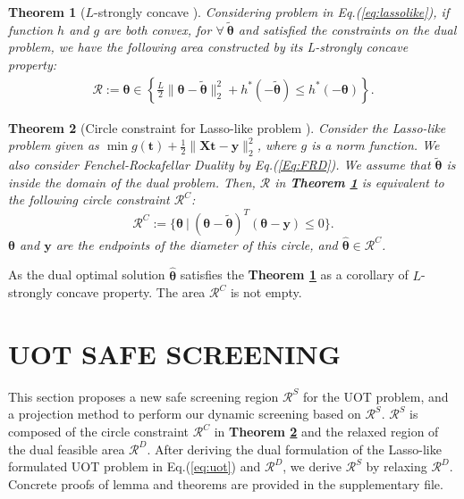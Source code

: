 \documentclass[twoside]{article}
\theoremstyle{plain}
\newtheorem{thm}{Theorem}
\newcommand{\mat}[1]{\mathbf{#1}}
\renewcommand{\vec}[1]{\bm{#1}}
\begin{document}
\begin{thm}[$L$-strongly concave {\citep[Theorem 5]{Yamada_NIPS_2021}}]
\label{Thm:circle}
Considering problem in Eq.(\ref{eq:lassolike}), if function $h$ and $g$ are both convex, for $\forall \ \tilde{\vec{\theta}}$ and satisfied the constraints on the dual problem, we have the following area constructed by its L-strongly concave property:
$$
\begin{aligned}
\mathcal{R}:=\vec{\theta} \in \left\{\frac{L}{2}\|\vec{\theta}-\tilde{\vec{\theta}}\|_2^2+h^*(-\tilde{\vec{\theta}}) \leq h^*(-\vec{\theta})\right\}.
\end{aligned}
$$
\end{thm}

\begin{thm}[Circle constraint for Lasso-like problem {\citep[Theorem 8]{Yamada_NIPS_2021}}]
\label{Thm:CC}
Consider the Lasso-like problem given as $\min g(\vec{t}) + \frac{1}{2}\|\mat{X} \vec{t}-\vec{y}\|_2^2$, where $g$ is a norm function. We also consider Fenchel-Rockafellar Duality by Eq.(\ref{Eq:FRD}). We assume that $\tilde{\vec{\theta}}$ is inside the domain of the dual problem. Then, $\mathcal{R}$ in {\bf Theorem \ref{Thm:circle}} is equivalent to the following circle constraint $\mathcal{R}^{C}$:
\begin{equation}
\mathcal{R}^{C} :=\{\vec\theta\ |\ (\vec{\theta}-\tilde{\vec{\theta}})^T(\vec{\theta}-\vec{y})\leq 0\}.
\label{eq:uotcircle}
\end{equation}
$\vec\theta$ and $\vec y$ are the endpoints of the diameter of this circle, and $\hat{ \vec\theta} \in \mathcal{R}^{C}$.
\end{thm}
As the dual optimal solution $\hat{\vec{\theta}}$ satisfies the {\bf Theorem \ref{Thm:circle}} as a corollary of $L$-strongly concave property. The area $\mathcal{R}^{C}$ is not empty. 



\section{UOT SAFE SCREENING}
\label{sec:pro}

This section proposes a new safe screening region $\mathcal{R}^S$ for the UOT problem, and a projection method to perform our dynamic screening based on $\mathcal{R}^S$. $\mathcal{R}^S$ is composed of the circle constraint $\mathcal{R}^C$ in {\bf Theorem \ref{Thm:CC}} and the relaxed region of the dual feasible area $\mathcal{R}^D$. After deriving the dual formulation of the Lasso-like formulated UOT problem in Eq.(\ref{eq:uot}) and $\mathcal{R}^D$, we derive $\mathcal{R}^S$ by relaxing $\mathcal{R}^D$. 
%
Concrete proofs of lemma and theorems are provided in the supplementary file.
\end{document}
